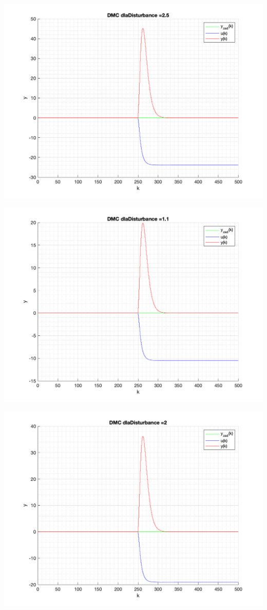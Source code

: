 \documentclass[a4paper, 11pt]{article}
\begin{document}
\begin{enumerate}
 \includegraphics[width=\linewidth]{./ModelsP4_Disturbance/P4_DMC_Disturbance_2_5_png.png} 
 
 \includegraphics[width=\linewidth]{./ModelsP4_Disturbance/P4_DMC_Disturbance_1_1_png.png} 
 
 \includegraphics[width=\linewidth]{./ModelsP4_Disturbance/P4_DMC_Disturbance_2_png.png} 
 

\end{enumerate}
\end{document}
